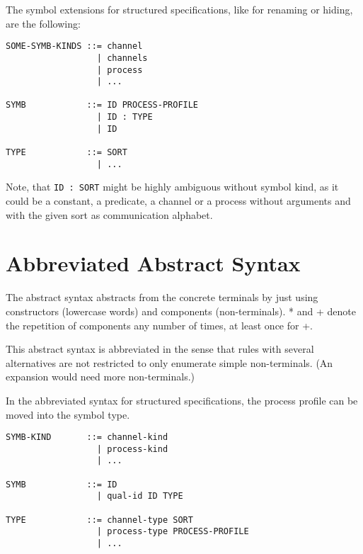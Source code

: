\documentclass{article}
\begin{document}
The symbol extensions for structured specifications, like for renaming or hiding,
are the following:

\begin{verbatim}
SOME-SYMB-KINDS ::= channel
                  | channels
                  | process
                  | ...

SYMB            ::= ID PROCESS-PROFILE
                  | ID : TYPE
                  | ID

TYPE            ::= SORT
                  | ...
\end{verbatim}

Note, that \verb|ID : SORT| might be highly ambiguous without symbol kind, as
it could be a constant, a predicate, a channel or a process without arguments
and with the given sort as communication alphabet.

\section{Abbreviated Abstract Syntax}

The abstract syntax abstracts from the concrete terminals by just using
constructors (lowercase words) and components (non-terminals). * and + denote
the repetition of components any number of times, at least once for +.

This abstract syntax is abbreviated in the sense that rules with several
alternatives are not restricted to only enumerate simple non-terminals.
(An expansion would need more non-terminals.)



In the abbreviated syntax for structured specifications, the process profile
can be moved into the symbol type.

\begin{verbatim}
SYMB-KIND       ::= channel-kind
                  | process-kind
                  | ...

SYMB            ::= ID
                  | qual-id ID TYPE

TYPE            ::= channel-type SORT
                  | process-type PROCESS-PROFILE
                  | ...
\end{verbatim}
\end{document}
